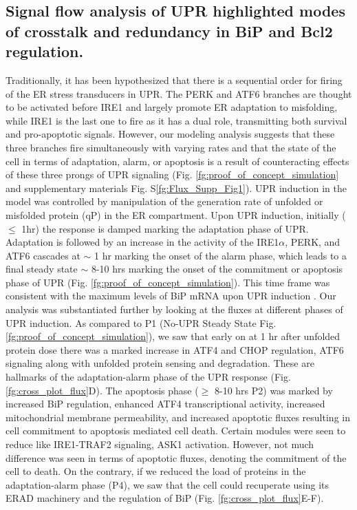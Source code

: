 \documentclass[fleqn,10pt]{wlscirep}
\begin{document}
\subsection*{Signal flow analysis of UPR highlighted modes of crosstalk and redundancy in BiP and Bcl2 regulation.}
Traditionally, it has been hypothesized that there is a sequential order for firing of the ER stress transducers in UPR.
The PERK and ATF6 branches are thought to be activated before IRE1 \cite{szegezdi2006mediators} and largely promote ER adaptation to misfolding, while IRE1 is the last one to fire as it has a dual role, transmitting both survival and pro-apoptotic signals.
However, our modeling analysis suggests that these three branches fire simultaneously with varying rates and that the state of the cell in terms of adaptation, alarm, or apoptosis is a result of counteracting effects of these three prongs of UPR signaling (Fig. \ref{fg:proof_of_concept_simulation} and supplementary materials Fig. S\ref{fg:Flux_Supp_Fig1}).
UPR induction in the model was controlled by manipulation of the generation rate of unfolded or misfolded protein (qP) in the ER compartment. Upon UPR induction, initially ($\leq$ 1hr) the response is damped marking the adaptation phase of UPR.
Adaptation is followed by an increase in the activity of the IRE1$\alpha$, PERK, and ATF6 cascades at $\sim$ 1 hr marking the onset of the alarm phase, which leads to a final steady state $\sim$ 8-10 hrs marking the onset of the commitment or apoptosis phase of UPR (Fig. \ref{fg:proof_of_concept_simulation}).
This time frame was consistent with the maximum levels of BiP mRNA upon UPR induction \cite{lin2007ire1}. Our analysis was substantiated further by looking at the fluxes at different phases of UPR induction. As compared to P1 (No-UPR Steady State Fig. \ref{fg:proof_of_concept_simulation}), we saw that early on at 1 hr after unfolded protein dose there was a marked increase in ATF4 and CHOP regulation, ATF6 signaling along with unfolded protein sensing and degradation.
These are hallmarks of the adaptation-alarm phase of the UPR response (Fig. \ref{fg:cross_plot_flux}D).
The apoptosis phase ($\geq$ 8-10 hrs P2) was marked by increased BiP regulation, enhanced ATF4 transcriptional activity, increased mitochondrial membrane permeability, and increased apoptotic fluxes resulting in cell commitment to apoptosis mediated cell death.
Certain modules were seen to reduce like IRE1-TRAF2 signaling, ASK1 activation.
However, not much difference was seen in terms of apoptotic fluxes, denoting the commitment of the cell to death.
On the contrary, if we reduced the load of proteins in the adaptation-alarm phase (P4), we saw that the cell could recuperate using its ERAD machinery and the regulation of BiP (Fig. \ref{fg:cross_plot_flux}E-F).
\end{document}
